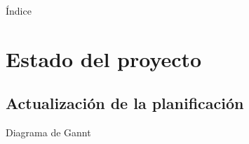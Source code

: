 \documentclass[9pt,xcolor=svgnames]{beamer}
\begin{document}


\begin{frame}
 \titlepage
\end{frame}

\normalsize

\begin{frame}{Índice} 
 \transdissolve
 \tableofcontents
\end{frame}
  
  
 \section{Estado del proyecto}
 
  \subsection{Actualización de la planificación}
  
  \begin{frame}{Diagrama de Gannt}
   
   
  \end{frame}
  
\end{document}
